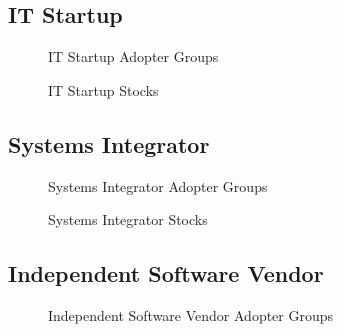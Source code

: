 	\subsection{IT Startup}\label{ch:app05:cs:its}

	\begin{figure}[htb]
		\centering
		
		\caption{IT Startup Adopter Groups}
	\end{figure}

	\begin{figure}[htb]
		\centering
		
		\caption{IT Startup Stocks}
	\end{figure}

	\newpage
	\subsection{Systems Integrator}\label{ch:app05:cs:si}

	\begin{figure}[htb]
		\centering
		
		\caption{Systems Integrator Adopter Groups}
	\end{figure}

	\begin{figure}[htb]
		\centering
		
		\caption{Systems Integrator Stocks}
	\end{figure}

	\newpage
	\subsection{Independent Software Vendor}\label{ch:app05:cs:isv}

	\begin{figure}[htb]
		\centering
		
		\caption{Independent Software Vendor Adopter Groups}
	\end{figure}

